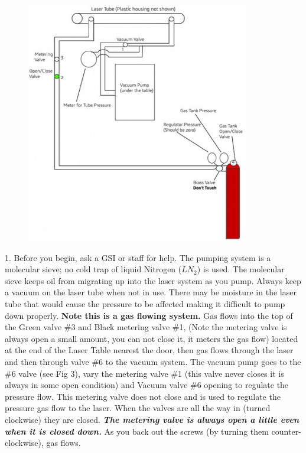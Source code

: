 \documentclass{../lab}
\begin{document}
\begin{figure}[h]
    \centering
    \href{http://experimentationlab.berkeley.edu/sites/default/files/upimages/lasergaspic_small.jpg}{\includegraphics[width=\linewidth]{images/lasergaspic_small.jpg}}
    \caption{}
    \label{fig:lasergaspic_small}
\end{figure}

1. Before you begin, ask a GSI or staff for help. The pumping system is a molecular sieve; no cold trap of liquid Nitrogen ($LN_2$) is used. The molecular sieve keeps oil from migrating up into the laser system as you pump. Always keep a vacuum on the laser tube when not in use. There may be moisture in the laser tube that would cause the pressure to be affected making it difficult to pump down properly. \textbf{Note this is a gas flowing system. } Gas flows into the top of the Green valve \#3 and Black metering valve \#1, (Note the metering valve is always open a small amount, you can not close it, it meters the gas flow) located at the end of the Laser Table nearest the door, then gas flows through the laser and then through valve \#6 to the vacuum system. The vacuum pump goes to the \#6 valve (see Fig 3), vary the metering valve \#1 (this valve never closes it is always in some open condition) and Vacuum valve \#6 opening to regulate the pressure flow. This metering valve does not close and is used to regulate the pressure gas flow to the laser. When the valves are all the way in (turned clockwise) they are closed. \emph{\textbf{The metering valve is always open a little even when it is closed down.}} As you back out the screws (by turning them counter-clockwise), gas flows.
\end{document}
